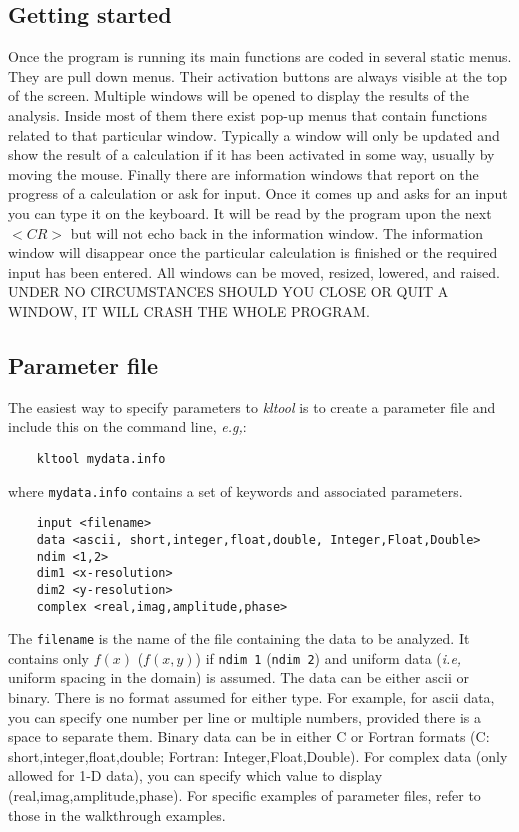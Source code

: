 \subsection{Getting started}
Once the program is running its main functions are coded in several static menus. They are pull down menus. Their activation buttons are always visible at the top of the screen. Multiple windows will be opened to display the results of the analysis. Inside most of them there exist pop-up menus that contain functions related to that particular window. Typically a window will only be updated and show the result of a calculation if it has been activated in some way, usually by moving the mouse.  Finally there are information windows that 
report on the progress of a calculation or ask for input. Once it comes up
and asks for an input you can type it on the keyboard. It will be read by the
program upon the next $<CR>$ but will not echo back in the information window. The information window will disappear once the particular calculation is finished or the required input has been entered. 
All windows can be moved, resized, lowered, and raised.\\
UNDER NO CIRCUMSTANCES SHOULD YOU CLOSE OR QUIT A WINDOW, IT WILL CRASH THE WHOLE PROGRAM.

\subsection{Parameter file}
\label{sec:paramfile}
The easiest way to specify parameters to {\sl kltool} is to create a parameter file and
include this on the command line, {\sl e.g,}:
\begin{verbatim}
	kltool mydata.info
\end{verbatim}
where {\tt mydata.info} contains a set of keywords and associated parameters.
\begin{verbatim}
	input <filename>
	data <ascii, short,integer,float,double, Integer,Float,Double>
	ndim <1,2>
	dim1 <x-resolution>
	dim2 <y-resolution>
	complex <real,imag,amplitude,phase>
\end{verbatim}
The {\tt filename} is the name of the file containing the data to be analyzed.
It contains only $f(x)$ ($f(x,y)$) if {\tt ndim 1} ({\tt ndim 2}) and uniform data
({\sl i.e,} uniform spacing in the domain) is assumed.
The data can be either ascii or binary.  There is no format assumed for either type.
For example, for ascii data, you can specify one number per line or multiple numbers,
provided there is a space to separate them.  Binary data can be in either C or Fortran
formats (C: short,integer,float,double;  Fortran: Integer,Float,Double).  For complex data
(only allowed for 1-D data), you can specify which value to display (real,imag,amplitude,phase).
For specific examples of parameter files, refer to those in the walkthrough examples.


